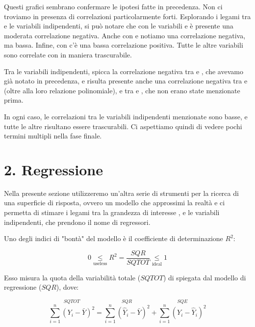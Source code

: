 Questi grafici sembrano confermare le ipotesi fatte in precedenza. Non ci troviamo in presenza di correlazioni particolarmente forti. Esplorando i legami tra \texttt{} e le variabili indipendenti, si può notare che con le variabili \texttt{} e \texttt{} è presente una moderata correlazione negativa. Anche con \texttt{} e \texttt{} notiamo una correlazione negativa, ma bassa. Infine, con \texttt{} c'è una bassa correlazione positiva. Tutte le altre variabili sono correlate con \texttt{} in maniera trascurabile.

Tra le variabili indipendenti, spicca la correlazione negativa tra \texttt{} e \texttt{}, che avevamo già notato in precedenza, e risulta presente anche una correlazione negativa tra \texttt{} e \texttt{} (oltre alla loro relazione polinomiale), e tra \texttt{} e \texttt{}, che non erano state menzionate prima.

In ogni caso, le correlazioni tra le variabili indipendenti menzionate sono basse, e tutte le altre risultano essere trascurabili. Ci aspettiamo quindi di vedere pochi termini multipli nella fase finale.

\section{2. Regressione}
\label{sec:2-regressione}

Nella presente sezione utilizzeremo un'altra serie di strumenti per la ricerca di una superficie di risposta, ovvero un modello che approssimi la realtà e ci permetta di stimare i legami tra la grandezza di interesse \texttt{}, e le variabili indipendenti, che prendono il nome di regressori.

Uno degli indici di "bontà" del modello è il coefficiente di determinazione $R^2$:

\[
0 \underset{\text{useless}}{\le} R^2 = \frac{SQR}{SQTOT} \underset{\text{ideal}}{\le} 1
\]

Esso misura la quota della variabilità totale ($SQTOT$) di \texttt{} spiegata dal modello di regressione ($SQR$), dove:

\[
\overset{SQTOT}{\sum_{i=1}^{n} (Y_i - \bar{Y})^2} = \overset{SQR}{\sum_{i=1}^{n} (\hat{Y}_i - \bar{Y})^2} + \overset{SQE}{\sum_{i=1}^{n} (Y_i - \hat{Y}_i)^2}
\]

